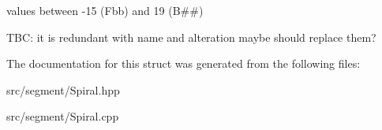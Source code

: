 values between -\/15 (Fbb) and 19 (B\#\#)

T\+BC\+: it is redundant with name and alteration maybe should replace them? 

The documentation for this struct was generated from the following files\+:\begin{DoxyCompactItemize}
\item 
src/segment/Spiral.\+hpp\item 
src/segment/Spiral.\+cpp\end{DoxyCompactItemize}
